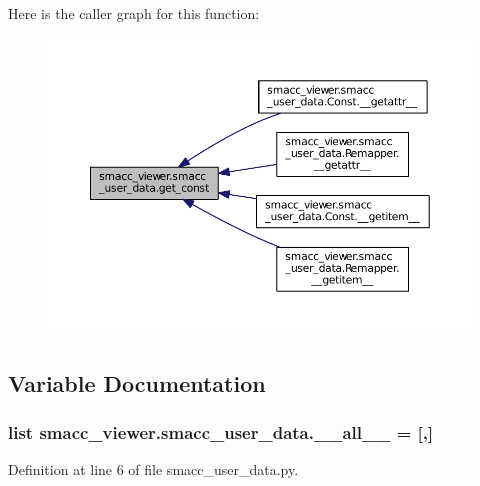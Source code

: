 Here is the caller graph for this function\+:
\nopagebreak
\begin{figure}[H]
\begin{center}
\leavevmode
\includegraphics[width=350pt]{namespacesmacc__viewer_1_1smacc__user__data_aca85c67e60fb6f052014a8584ba85d38_icgraph}
\end{center}
\end{figure}




\subsection{Variable Documentation}
\subsubsection[{\texorpdfstring{\+\_\+\+\_\+all\+\_\+\+\_\+}{__all__}}]{\setlength{\rightskip}{0pt plus 5cm}list smacc\+\_\+viewer.\+smacc\+\_\+user\+\_\+data.\+\_\+\+\_\+all\+\_\+\+\_\+ = \mbox{[}\textquotesingle{},\textquotesingle{}\mbox{]}\hspace{0.3cm}{\ttfamily [private]}}\hypertarget{namespacesmacc__viewer_1_1smacc__user__data_aeab8192696d125744891fa431706f5f9}{}\label{namespacesmacc__viewer_1_1smacc__user__data_aeab8192696d125744891fa431706f5f9}


Definition at line 6 of file smacc\+\_\+user\+\_\+data.\+py.

